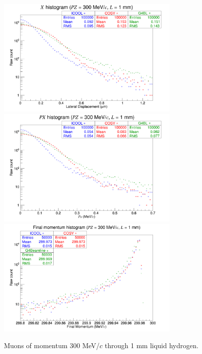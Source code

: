 \begin{figure}[!htb]
  \centering
    \includegraphics[width=0.8\textwidth]{Validation/LH/X.300.1.png} 
    \includegraphics[width=0.8\textwidth]{Validation/LH/PX.300.1.png} 
    \includegraphics[width=0.8\textwidth]{Validation/LH/strag.300.1.png} 
  \caption{Muons of momentum 300 MeV/$c$ through 1 mm liquid hydrogen.}
  \label{fig:300.1}
\end{figure}


